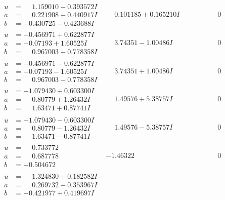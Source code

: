\documentclass[1p]{elsarticle_modified}
\theoremstyle{definition}
\begin{document}
$$\begin{array}{c|c|c}
\begin{aligned}
u &= \phantom{-}1.159010 - 0.393572 I \\
a &= \phantom{-}0.221908 + 0.440917 I \\
b &= -0.430725 - 0.423688 I\end{aligned}
 & \phantom{-}0.101185 + 0.165210 I & \phantom{-0.000000 } 0 \\ \hline\begin{aligned}
u &= -0.456971 + 0.622877 I \\
a &= -0.07193 + 1.60525 I \\
b &= \phantom{-}0.967003 + 0.778358 I\end{aligned}
 & \phantom{-}3.74351 - 1.00486 I & \phantom{-0.000000 } 0 \\ \hline\begin{aligned}
u &= -0.456971 - 0.622877 I \\
a &= -0.07193 - 1.60525 I \\
b &= \phantom{-}0.967003 - 0.778358 I\end{aligned}
 & \phantom{-}3.74351 + 1.00486 I & \phantom{-0.000000 } 0 \\ \hline\begin{aligned}
u &= -1.079430 + 0.603300 I \\
a &= \phantom{-}0.80779 + 1.26432 I \\
b &= \phantom{-}1.63471 + 0.87741 I\end{aligned}
 & \phantom{-}1.49576 + 5.38757 I & \phantom{-0.000000 } 0 \\ \hline\begin{aligned}
u &= -1.079430 - 0.603300 I \\
a &= \phantom{-}0.80779 - 1.26432 I \\
b &= \phantom{-}1.63471 - 0.87741 I\end{aligned}
 & \phantom{-}1.49576 - 5.38757 I & \phantom{-0.000000 } 0 \\ \hline\begin{aligned}
u &= \phantom{-}0.733772\phantom{ +0.000000I} \\
a &= \phantom{-}0.687778\phantom{ +0.000000I} \\
b &= -0.504672\phantom{ +0.000000I}\end{aligned}
 & -1.46322\phantom{ +0.000000I} & \phantom{-0.000000 } 0 \\ \hline\begin{aligned}
u &= \phantom{-}1.324830 + 0.182582 I \\
a &= \phantom{-}0.269732 - 0.353967 I \\
b &= -0.421977 + 0.419697 I\end{aligned}

\end{array}$$
\end{document}
